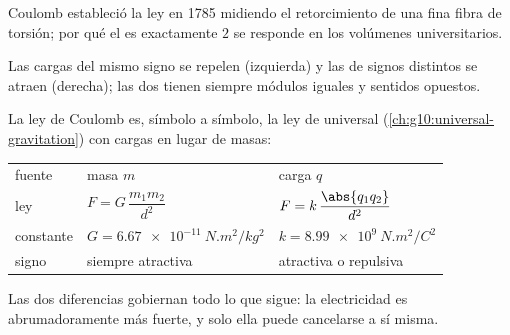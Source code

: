 \begin{remark}\label{rem:g11:fundamental-interactions:torsion}
Coulomb estableció la ley en 1785 midiendo el retorcimiento de una fina
fibra de torsión; por qué el  es exactamente $2$ se responde en
los volúmenes universitarios.
\end{remark}

\begin{omfigure}
\qquad
{}

{\small Las cargas del mismo signo se repelen (izquierda) y las de
signos distintos se atraen (derecha); las dos  tienen siempre
módulos iguales y sentidos opuestos.}
\end{omfigure}

\begin{remark}\label{rem:g11:fundamental-interactions:twin}
La ley de Coulomb es, símbolo a símbolo, la ley de  universal
(\cref{ch:g10:universal-gravitation}) con cargas en lugar de masas:
\begin{center}
\begin{tabular}{lll}
fuente & masa $m$ & carga $q$ \\
ley & $F = G\,\dfrac{m_1 m_2}{d^2}$ & $F = k\,\dfrac{\abs{q_1 q_2}}{d^2}$ \\[1.5ex]
constante & $G = \qty{6.67e-11}{N.m^2/kg^2}$ & $k = \qty{8.99e9}{N.m^2/C^2}$ \\
signo & siempre atractiva & atractiva o repulsiva \\
\end{tabular}
\end{center}
Las dos diferencias gobiernan todo lo que sigue: la electricidad es
abrumadoramente más fuerte, y solo ella puede cancelarse a sí misma.
\end{remark}

